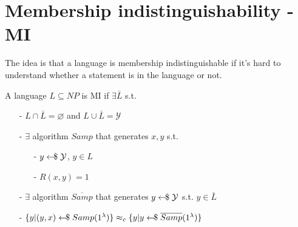 \section{Membership indistinguishability - MI}
The idea is that a language is membership indistinguishable if it's hard to understand whether a statement is in the language or not.

A language $L \subseteq NP$ is MI if $\exists \bar{L}$ s.t.
\begin{itemize}
    \item[-] $L \cap \bar{L} = \varnothing$ and $L \cup \bar{L} = \mathcal{Y}$
    \item[-] $\exists$ algorithm $Samp$ that generates $x,y$ s.t.
            \begin{itemize}
                \item[-] $y \leftarrow\kern-0.42em{\$} \; \mathcal{Y}$, $y \in L$
                \item[-] $R(x,y) = 1$ 
            \end{itemize} 
    \item[-] $\exists$ algorithm $\overline{Samp}$ that generates $y \leftarrow\kern-0.42em{\$} \; \mathcal{Y}$ s.t. $y \in \bar{L}$
    \item[-] $ \{ y \vert (y,x) \leftarrow\kern-0.42em{\$} \; Samp(1^\lambda) \} \approx_c \{ y \vert y \leftarrow\kern-0.42em{\$} \; \overline{Samp}(1^\lambda) \} $ 
\end{itemize}